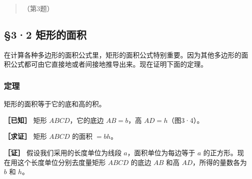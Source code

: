 \begin{quote}
（第3题）
\end{quote}

\subsection{§3·2 矩形的面积}

在计算各种多边形的面积公式里，矩形的面积公式特别重要。因为其他多边形的面积公式都可由它直接地或者间接地推导出来。现在证明下面的定理。

\subsubsection{定理}

矩形的面积等于它的底和高的积。

\textbf{［已知］} 矩形 \(ABCD\)，它的底边 \(AB = b\)，高
\(AD = h\)（图3·4）。

\textbf{［求证］} 矩形 \(ABCD\) 的面积 \(= bh\)。

\textbf{［证］} 假设我们采用的长度单位为线段 \(a\)，面积单位为每边等于
\(a\) 的正方形。现在用这个长度单位分别去度量矩形 \(ABCD\) 的底边 \(AB\)
和高 \(AD\)，所得的量数各为 \(b\) 和 \(h\)。

